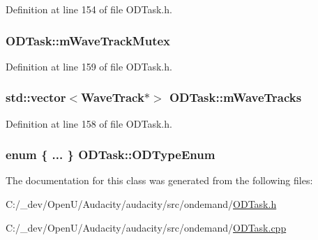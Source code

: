 Definition at line 154 of file O\+D\+Task.\+h.

\subsubsection[{\texorpdfstring{m\+Wave\+Track\+Mutex}{mWaveTrackMutex}}]{ O\+D\+Task\+::m\+Wave\+Track\+Mutex\hspace{0.3cm}{\ttfamily [protected]}}\hypertarget{class_o_d_task_ae51c8c57331a0caea29ac0e26a295685}{}\label{class_o_d_task_ae51c8c57331a0caea29ac0e26a295685}


Definition at line 159 of file O\+D\+Task.\+h.

\subsubsection[{\texorpdfstring{m\+Wave\+Tracks}{mWaveTracks}}]{\setlength{\rightskip}{0pt plus 5cm}std\+::vector$<${\bf Wave\+Track}$\ast$$>$ O\+D\+Task\+::m\+Wave\+Tracks\hspace{0.3cm}{\ttfamily [protected]}}\hypertarget{class_o_d_task_aba0bd65cc43443f5eb27bc5278334bf2}{}\label{class_o_d_task_aba0bd65cc43443f5eb27bc5278334bf2}


Definition at line 158 of file O\+D\+Task.\+h.

\subsubsection[{\texorpdfstring{O\+D\+Type\+Enum}{ODTypeEnum}}]{\setlength{\rightskip}{0pt plus 5cm}enum \{ ... \}   O\+D\+Task\+::\+O\+D\+Type\+Enum}\hypertarget{class_o_d_task_a4ec3640943ae9a1af7c4d4081213a7ff}{}\label{class_o_d_task_a4ec3640943ae9a1af7c4d4081213a7ff}


The documentation for this class was generated from the following files\+:\begin{DoxyCompactItemize}
\item 
C\+:/\+\_\+dev/\+Open\+U/\+Audacity/audacity/src/ondemand/\hyperlink{_o_d_task_8h}{O\+D\+Task.\+h}\item 
C\+:/\+\_\+dev/\+Open\+U/\+Audacity/audacity/src/ondemand/\hyperlink{_o_d_task_8cpp}{O\+D\+Task.\+cpp}\end{DoxyCompactItemize}
